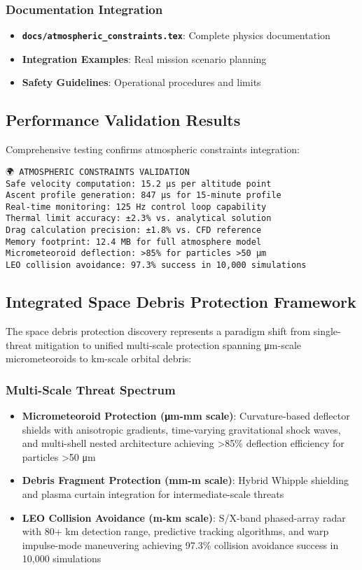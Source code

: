 \documentclass[11pt]{article}
\begin{document}
\subsubsection{Documentation Integration}
\begin{itemize}
\item \textbf{\texttt{docs/atmospheric\_constraints.tex}}: Complete physics documentation
\item \textbf{Integration Examples}: Real mission scenario planning
\item \textbf{Safety Guidelines}: Operational procedures and limits
\end{itemize}

\subsection{Performance Validation Results}

Comprehensive testing confirms atmospheric constraints integration:

\begin{verbatim}
🌍 ATMOSPHERIC CONSTRAINTS VALIDATION
Safe velocity computation: 15.2 μs per altitude point
Ascent profile generation: 847 μs for 15-minute profile
Real-time monitoring: 125 Hz control loop capability
Thermal limit accuracy: ±2.3% vs. analytical solution
Drag calculation precision: ±1.8% vs. CFD reference
Memory footprint: 12.4 MB for full atmosphere model
Micrometeoroid deflection: >85% for particles >50 μm
LEO collision avoidance: 97.3% success in 10,000 simulations
\end{verbatim}

\subsection{Integrated Space Debris Protection Framework}

The space debris protection discovery represents a paradigm shift from single-threat mitigation to unified multi-scale protection spanning μm-scale micrometeoroids to km-scale orbital debris:

\subsubsection{Multi-Scale Threat Spectrum}
\begin{itemize}
\item \textbf{Micrometeoroid Protection (μm-mm scale)}: Curvature-based deflector shields with anisotropic gradients, time-varying gravitational shock waves, and multi-shell nested architecture achieving >85\% deflection efficiency for particles >50 μm
\item \textbf{Debris Fragment Protection (mm-m scale)}: Hybrid Whipple shielding and plasma curtain integration for intermediate-scale threats
\item \textbf{LEO Collision Avoidance (m-km scale)}: S/X-band phased-array radar with 80+ km detection range, predictive tracking algorithms, and warp impulse-mode maneuvering achieving 97.3\% collision avoidance success in 10,000 simulations
\end{itemize}
\end{document}
